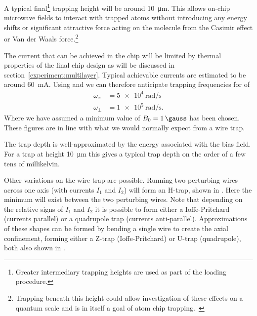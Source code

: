  A
typical final\footnote{Greater intermediary trapping heights are used as part of
the loading procedure.} trapping height will be around \SI{10}{\micro\metre}.
This allows on-chip microwave fields to interact with trapped atoms without
introducing any energy shifts  or significant attractive force acting on the
molecule from the Casimir effect or Van der Waals force.\footnote{Trapping
beneath this height could allow investigation of these effects on a quantum
scale and is in itself a goal of atom chip
trapping.~\cite{PhysRevA.56.R3350}}~\cite{2011Ac}

The current that can be achieved in the chip will be limited by thermal
properties of the final chip design as will be discussed in
section~\ref{experiment:multilayer}. Typical achievable currents are estimated
to be around \SI{60}{\milli\ampere}. 
Using  and
 we can therefore anticipate trapping frequencies
for \CaF{} of
%
\begin{align}
  \omega_x &= \SI{5e4}{\radian \per \second} \\
  \omega_\perp &= \SI{1e5}{\radian \per \second}.
\end{align}
%
Where we have assumed a minimum value of $B_0 = \SI{1}{\gauss}$ has been chosen.
These figures are in line with what we would normally expect from a wire
trap.~\cite{2011Ac}

The trap depth is well-approximated by the energy associated with the bias
field. For a trap at height \SI{10}{\micro\metre} this gives a typical trap
depth on the order of a few tens of millikelvin.~\cite{2011Ac}

Other variations on the wire trap are possible. Running two perturbing wires
across one axis (with currents $I_1$ and $I_2$) will form an H-trap, shown in
. Here the minimum will exist between the
two perturbing wires. Note that depending on the relative signs of $I_1$ and
$I_2$ it is possible to form either a Ioffe-Pritchard (currents parallel) or a
quadrupole trap (currents anti-parallel). Approximations of these shapes can be
formed by bending a single wire to create the axial confinement, forming either
a Z-trap (Ioffe-Pritchard) or U-trap (quadrupole), both also shown in
. 


